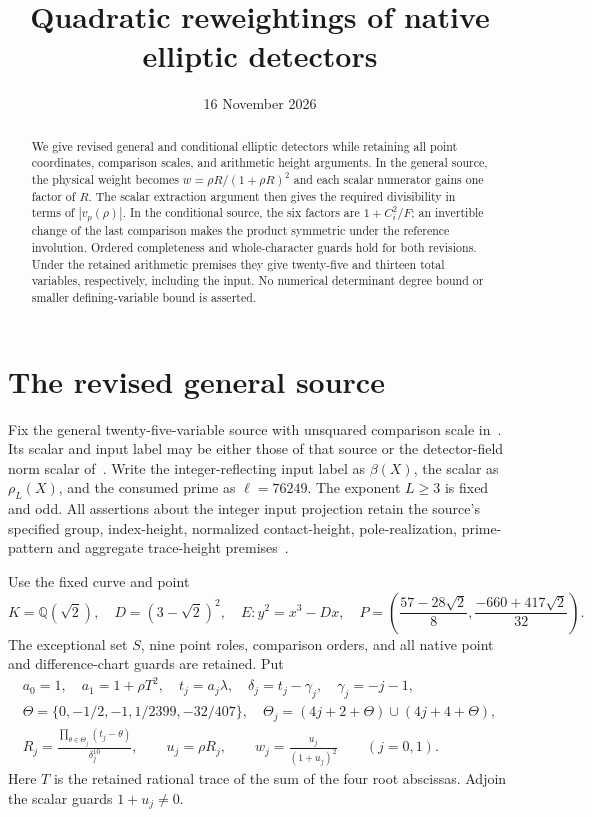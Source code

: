\documentclass[11pt,a4paper]{article}
\title{Quadratic reweightings of native elliptic detectors}
\author{}\date{16 November 2026}
\newcommand{\Q}{\mathbb Q}\newcommand{\Z}{\mathbb Z}
\begin{document}
\maketitle
\begin{abstract}
We give revised general and conditional elliptic detectors while retaining
all point coordinates, comparison scales, and arithmetic height arguments.
In the general source, the physical weight becomes
$w=\rho R/(1+\rho R)^2$ and each scalar numerator gains one factor of $R$.
The scalar extraction argument then gives the required divisibility in
terms of $|v_p(\rho)|$. In the conditional source, the six factors are
$1+C_i^2/F$; an invertible change of the last comparison makes the product
symmetric under the reference involution. Ordered completeness and
whole-character guards hold for both revisions. Under the retained
arithmetic premises they give twenty-five and thirteen total variables,
respectively, including the input. No numerical determinant degree bound
or smaller defining-variable bound is asserted.
\end{abstract}

\section{The revised general source}

Fix the general twenty-five-variable source with unsquared comparison
scale in~\cite{Unit}. Its scalar and input label may be either those
of that source or the detector-field norm scalar of~\cite{Aligned}.
Write the integer-reflecting input label as $\beta(X)$, the scalar as
$\rho_L(X)$, and the consumed prime as $\ell=76249$. The exponent
$L\ge3$ is fixed and odd. All assertions about the integer input
projection retain the source's specified group, index-height,
normalized contact-height, pole-realization, prime-pattern and
aggregate trace-height premises~\cite{General,Unit,Aligned}.

Use the fixed curve and point
\[
 K=\Q(\sqrt2),\quad D=(3-\sqrt2)^2,\quad E:y^2=x^3-Dx,
 \quad P=\left(\frac{57-28\sqrt2}{8},
                    \frac{-660+417\sqrt2}{32}\right).
\]
The exceptional set $S$, nine point roles, comparison orders, and
all native point and difference-chart guards are retained. Put
\begin{equation}\label{eq:contacts}
\begin{gathered}
 a_0=1,\quad a_1=1+\rho T^2,\quad t_j=a_j\lambda,\quad
 \delta_j=t_j-\gamma_j,\quad\gamma_j=-j-1,\\
 \Theta=\{0,-1/2,-1,1/2399,-32/407\},\quad
 \Theta_j=(4j+2+\Theta)\cup(4j+4+\Theta),\\
 R_j=\frac{\prod_{\theta\in\Theta_j}(t_j-\theta)}{\delta_j^{10}},
 \qquad u_j=\rho R_j,\qquad
 w_j=\frac{u_j}{(1+u_j)^2}\qquad(j=0,1).
\end{gathered}
\end{equation}
Here $T$ is the retained rational trace of the sum of the four root
abscissas. Adjoin the scalar guards $1+u_j\ne0$.
\end{document}

